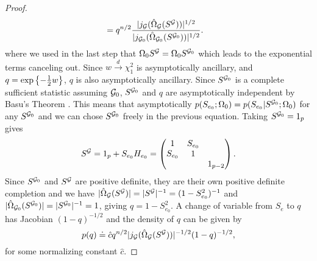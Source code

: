 \begin{proof}
\begin{align*}
        &= q^{n/2} \frac{|j_{\mathcal{G}}(\hat\Omega_{\mathcal{G}}(S^{\mathcal{G}})) |^{1/2}}    {|j_{{\mathcal{G}}_0}(\hat\Omega_{{\mathcal{G}}_0}(S^{{\mathcal{G}}_0})) |^{1/2}}.
    \end{align*}
    where we used in the last step that $\Omega_0 S^{\mathcal{G}} = \Omega_0 S^{{\mathcal{G}}_0}$ which leads to the exponential terms canceling out. Since $w \xrightarrow{d} \chi^2_1$ is asymptotically ancillary, and $q = \exp\left\{-\frac{1}{2} w\right\}$, $q$ is also asymptotically ancillary. Since $S^{{\mathcal{G}}_0}$ is a complete sufficient statistic assuming ${\mathcal{G}}_0$, $S^{{\mathcal{G}}_0}$ and $q$ are asymptotically independent by Basu's Theorem \cite{10.2307/25048259}. This means that asymptotically $p(S_{e_0}; \Omega_0) = p(S_{e_0} | S^{{\mathcal{G}}_0}; \Omega_0)$ for any $S^{{\mathcal{G}}_0}$ and we can chose $S^{{\mathcal{G}}_0}$ freely in the previous equation. Taking $S^{{\mathcal{G}}_0} = 1_p$ gives
    \begin{equation*}
        S^{\mathcal{G}} = 1_p + S_{e_0} H_{e_0} = \begin{pmatrix}
            1   & S_{e_0} & \\
            S_{e_0} & 1 & \\
                &   & 1_{p-2}
        \end{pmatrix}.
    \end{equation*}
    Since $S^{{\mathcal{G}}_0}$ and $S^{\mathcal{G}}$ are positive definite, they are their own positive definite completion and we have $|\hat\Omega_{\mathcal{G}}(S^{\mathcal{G}})| = |S^{\mathcal{G}}|^{-1} = (1 - S_{e_0}^2)^{-1}$ and $|\hat\Omega_{{\mathcal{G}}_0}(S^{{\mathcal{G}}_0})| = |S^{{\mathcal{G}}_0}|^{-1} = 1$, giving $q = 1 - S_{e_0}^2$. A change of variable from $S_e$ to $q$ has Jacobian $(1 - q)^{-1/2}$ and the density of $q$ can be given by
    \begin{equation} \label{eq-proof-almost-done}
        p(q) \doteq \hat c q^{n/2} |j_{{\mathcal{G}}}(\hat\Omega_{{\mathcal{G}}}(S^{{\mathcal{G}}})) |^{-1/2} (1 - q)^{-1/2},
    \end{equation}
    for some normalizing constant $\hat c$.


\end{proof}
